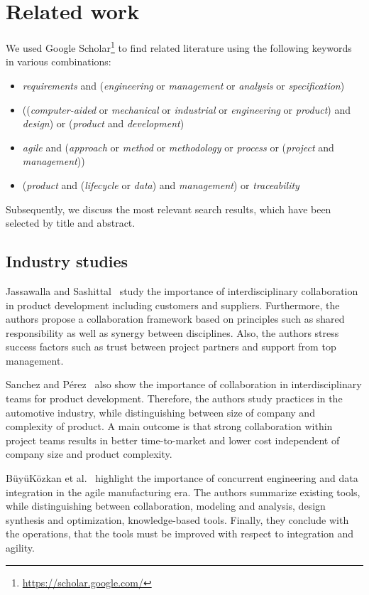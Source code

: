    \section{Related work}
    \label{sec:differentiation}
    We used Google Scholar\footnote{\url{https://scholar.google.com/}} to find related literature using the following keywords in various combinations:
    \begin{itemize}
        \item \textit{requirements} and (\textit{engineering} or \textit{management} or \textit{analysis} or \textit{specification})
        \item ((\textit{computer-aided} or \textit{mechanical} or \textit{industrial} or \textit{engineering} or \textit{product}) and \textit{design}) or (\textit{product} and \textit{development})
        \item \textit{agile} and (\textit{approach} or \textit{method} or \textit{methodology} or \textit{process} or (\textit{project} and \textit{management}))
        \item (\textit{product} and (\textit{lifecycle} or \textit{data}) and \textit{management}) or \textit{traceability}
    \end{itemize}
    Subsequently, we discuss the most relevant search results, which have been selected by title and abstract.
    
    \subsection*{Industry studies}
    Jassawalla and Sashittal~\cite{Jassawalla} study the importance of interdisciplinary collaboration in product development including customers and suppliers.
    Furthermore, the authors propose a collaboration framework based on principles such as shared responsibility as well as synergy between disciplines.
    Also, the authors stress success factors such as trust between project partners and support from top management.

    Sanchez and P{\'e}rez~\cite{sanchez2003flexibility} also show the importance of collaboration in interdisciplinary teams for product development.
    Therefore, the authors study practices in the automotive industry, while distinguishing between size of company and complexity of product.
    A main outcome is that strong collaboration within project teams results in better time-to-market and lower cost independent of company size and product complexity.
    
    B{\"u}y{\"u}K{\"o}zkan et al.~\cite{buyukozkan2004survey} highlight the importance of concurrent engineering and data integration in the agile manufacturing era.
    The authors summarize existing tools, while distinguishing between collaboration, modeling and analysis, design synthesis and optimization, knowledge-based tools.
    Finally, they conclude with the operations, that the tools must be improved with respect to integration and agility.
    
